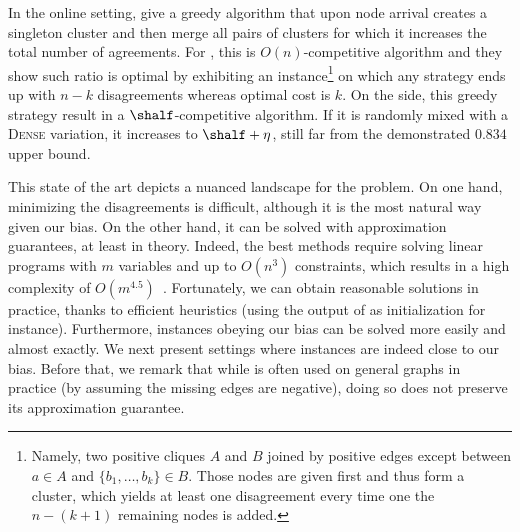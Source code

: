In the online setting, \textcite{greedyOnline10} give a greedy algorithm that upon node arrival creates a
singleton cluster and then merge all pairs of clusters for which it increases the total number of
agreements. For \mind{}, this is $O(n)$-competitive algorithm and they show such ratio is optimal by
exhibiting an instance\footnote{Namely, two positive cliques $A$ and $B$ joined by positive edges except
between $a\in A$ and $\{b_1,\ldots, b_k\}\in B$. Those nodes are given first and thus form a cluster,
which yields at least one disagreement every time one the $n-(k+1)$ remaining nodes is added.} on
which any strategy ends up with $n - k$ disagreements whereas optimal cost is $k$. On the \maxa{}
side, this greedy strategy result in a $\shalf$-competitive algorithm. If it is randomly mixed with a
\textsc{Dense} variation, it increases to $\shalf+\eta$, still far from the demonstrated $0.834$ upper
bound.

\bigskip

This state of the art depicts a nuanced landscape for the \pcc{} problem. On one hand, minimizing
the disagreements is difficult, although it is the most natural way given our bias. On the other
hand, it can be solved with approximation guarantees, at least in theory. Indeed, the best methods
require solving linear programs with $m$ variables and up to $O(n^3)$ constraints, which results in
a high complexity of $O(m^{4.5})$~\autocite[Section 7.2]{LPBook07}. Fortunately, we can obtain
reasonable solutions in practice, thanks to efficient heuristics (using the output of \ccpivot{} as
initialization for instance). Furthermore, instances obeying our bias can be solved more easily and
almost exactly. We next present settings where instances are indeed close to our bias.
Before that, we remark that while \ccpivot{} is often used on general graphs in practice (by
assuming the missing edges are negative), doing so does not preserve its approximation guarantee.

